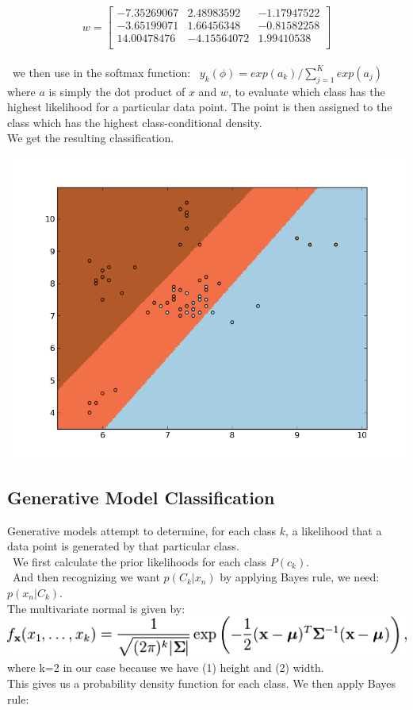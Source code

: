 \documentclass[11pt, oneside]{article}   	%
\begin{document}
\[
w=
  \begin{bmatrix}
    -7.35269067 & 2.48983592 & -1.17947522\\
    -3.65199071 & 1.66456348 & -0.81582258\\
    14.00478476 & -4.15564072 & 1.99410538\\	
	
  \end{bmatrix}
\]
\\
\
 we then use in the softmax function:
\
$y_k(\phi) = exp(a_k)/\sum\limits_{j=1}^K exp(a_j)$
\\
where $a$ is simply the dot product of $x$ and $w$, to evaluate which class has the highest likelihood for a particular data point. The point is then assigned to the class which has the highest class-conditional density.
\\
We get the resulting classification.
\begin{center}
  \includegraphics[scale=.55]{logistic_classifer}
\end{center}


\subsection*{Generative Model Classification}

Generative models attempt to determine, for each class $k$, a likelihood that a data point is generated by that particular class.
\\
\ We first calculate the prior likelihoods for each class $P(c_k)$.
\\
\ And then recognizing we want $p(C_k |x_n)$ by applying Bayes rule, we need: $p(x_n |C_k)$.
\\
The multivariate normal is given by:
\
\\
 \includegraphics[scale=.5]{formula}
\\
where k=2 in our case because we have (1) height and (2) width.
\
\\
This gives us a probability density function for each class. We then apply Bayes rule:
\end{document}

